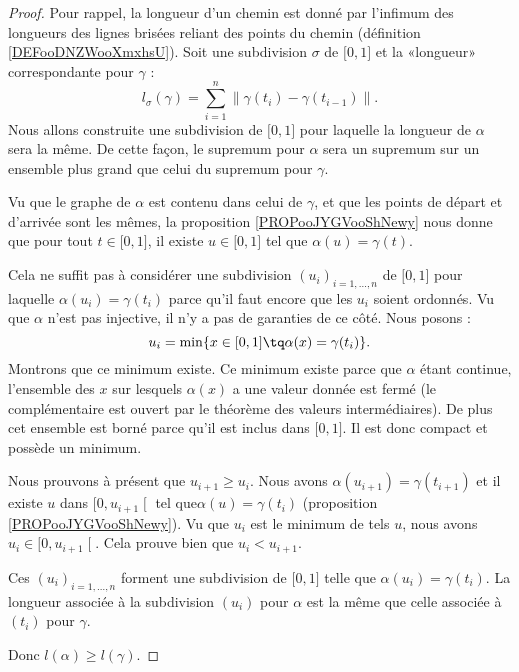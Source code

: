 \begin{proof}
	Pour rappel, la longueur d'un chemin est donné par l'infimum des longueurs des lignes brisées reliant des points du chemin (définition \ref{DEFooDNZWooXmxhsU}). Soit une subdivision \( \sigma\) de \( \mathopen[ 0 , 1 \mathclose]\) et la «longueur» correspondante pour \( \gamma\) :
	\begin{equation}
		l_{\sigma}(\gamma)=\sum_{i=1}^n\| \gamma(t_i)-\gamma(t_{i-1}) \|.
	\end{equation}
	Nous allons construite une subdivision de \( \mathopen[ 0 , 1 \mathclose]\) pour laquelle la longueur de \( \alpha\) sera la même. De cette façon, le supremum pour \( \alpha\) sera un supremum sur un ensemble plus grand que celui du supremum pour \( \gamma\).

	Vu que le graphe de \( \alpha\) est contenu dans celui de \( \gamma\), et que les points de départ et d'arrivée sont les mêmes, la proposition \ref{PROPooJYGVooShNewy} nous donne que pour tout \( t\in \mathopen[ 0 , 1 \mathclose]\), il existe \( u\in\mathopen[ 0 , 1 \mathclose]\) tel que \( \alpha(u)=\gamma(t)\).

	Cela ne suffit pas à considérer une subdivision \( (u_i)_{i=1,\ldots, n}\) de \( \mathopen[ 0 , 1 \mathclose]\) pour laquelle \( \alpha(u_i)=\gamma(t_i)\) parce qu'il faut encore que les \( u_i\) soient ordonnés. Vu que \( \alpha\) n'est pas injective, il n'y a pas de garanties de ce côté. Nous posons :
	\begin{equation}
		u_i=\min\{ x\in \mathopen[ 0 , 1 \mathclose]\tq \alpha(x)=\gamma(t_i) \}.
	\end{equation}
	Montrons que ce minimum existe. Ce minimum existe parce que \( \alpha\) étant continue, l'ensemble des \( x\) sur lesquels \( \alpha(x)\) a une valeur donnée est fermé (le complémentaire est ouvert par le théorème des valeurs intermédiaires). De plus cet ensemble est borné parce qu'il est inclus dans \( \mathopen[ 0 , 1 \mathclose]\). Il est donc compact et possède un minimum.

	Nous prouvons à présent que \( u_{i+1}\geq u_i\). Nous avons \( \alpha(u_{i+1})=\gamma(t_{i+1})\) et il existe \( u\) dans \( \mathopen[ 0 , u_{i+1} \mathclose[\) tel que\( \alpha(u)=\gamma(t_i)\) (proposition \ref{PROPooJYGVooShNewy}). Vu que \( u_i\) est le minimum de tels \( u\), nous avons \( u_i\in\mathopen[ 0 , u_{i+1} \mathclose[\). Cela prouve bien que \( u_i<u_{i+1}\).

	Ces \( (u_i)_{i=1,\ldots, n}\) forment une subdivision de \( \mathopen[ 0 , 1 \mathclose]\) telle que \( \alpha(u_i)=\gamma(t_i)\). La longueur associée à la subdivision \( (u_i)\) pour \( \alpha\) est la même que celle associée à \( (t_i)\) pour \( \gamma\).

	Donc \( l(\alpha)\geq l(\gamma)\).
\end{proof}


